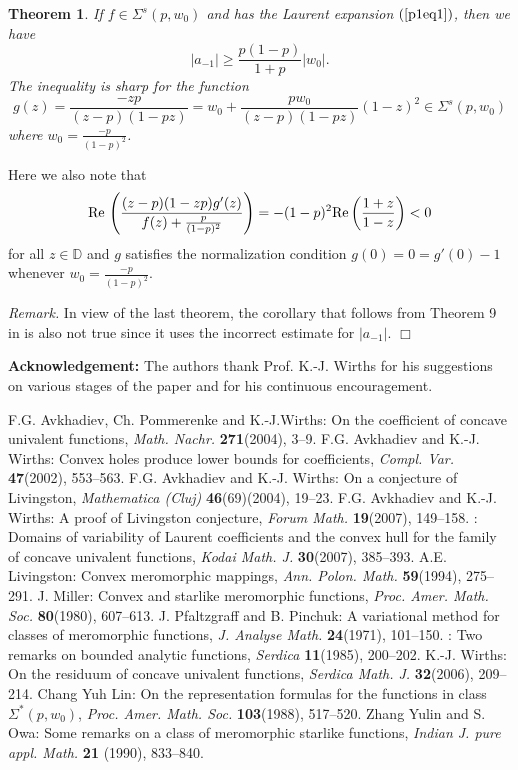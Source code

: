 \documentclass[leqno,
12pt]{amsart}
\newtheorem{thm}{Theorem}[section]
\theoremstyle{definition}
\newenvironment{rem}{\bigskip
\noindent \textsl{{\sl Remark. }}}{\bigskip}
\begin{document}
\begin{thm}\label{1th7}
If $f\in\Sigma^{s}(p, w_0)$ and has the Laurent expansion
$(\ref{p1eq1})$, then we have
$$|a_{-1}|\geq \frac{p(1-p)}{1+p}|w_0|.
$$
The inequality is sharp for the function
$$g(z)=\frac{-zp}{(z-p)(1-pz)}
= w_0+\frac{pw_0}{(z-p)(1-pz)}(1-z)^2\in \Sigma^{s}(p, w_0)
$$
where $w_0=\frac{-p}{(1-p)^2}$.
\end{thm}

Here we also note that
$${\rm Re}\, \left(\frac{(z-p)(1-zp)g'(z)}{f(z)+\frac{p}{(1-p)^2}}\right)
=-(1-p)^2 {\rm Re}\left(\frac{1+z}{1-z}\right)<0
$$
for all $z\in {{\mathbb D}}$ and $g$ satisfies the normalization condition $g(0)=0=g'(0)-1$
whenever $w_0=\frac{-p}{(1-p)^2}$.

\begin{rem}
In view of the last theorem, the corollary that follows from Theorem 9 in \cite{Living-94}
is also not true since it uses the incorrect estimate for $|a_{-1}|$.
\hfill $\Box$
\end{rem}

{\bf Acknowledgement:} The authors thank Prof. K.-J. Wirths for his
suggestions on various stages of the paper and for his
continuous encouragement.

\begin{thebibliography}{99}
 {\sc F.G. Avkhadiev, Ch. Pommerenke and K.-J.Wirths}:
On the coefficient of concave univalent functions,
\textit{Math. Nachr.} {\bf 271}(2004),  3--9.
 {\sc F.G. Avkhadiev  and K.-J. Wirths}:
Convex holes produce lower bounds for coefficients,
\textit{Compl. Var.} {\bf 47}(2002),  553--563.
 {\sc F.G. Avkhadiev and K.-J. Wirths}:
On a conjecture of Livingston,
\textit{Mathematica (Cluj)} {\bf 46}(69)(2004),  19--23.
 {\sc F.G. Avkhadiev and K.-J. Wirths}:
A proof of Livingston conjecture,
\textit{Forum Math.} {\bf 19}(2007),  149--158.
:
Domains of variability of Laurent coefficients and the convex hull for the family of concave
univalent functions, \textit{Kodai Math. J.} {\bf 30}(2007),  385--393.
 {\sc A.E. Livingston}:
Convex meromorphic mappings,
\textit{Ann. Polon. Math.} {\bf 59}(1994),  275--291.
 {\sc J. Miller}:
Convex and starlike meromorphic functions,
\textit{Proc. Amer. Math. Soc.} {\bf 80}(1980), 607--613.
 {\sc J. Pfaltzgraff  and B. Pinchuk}:
A variational method for classes of meromorphic functions,
\textit{J. Analyse Math.} {\bf 24}(1971),  101--150.
:
Two remarks on bounded analytic functions, \textit{Serdica} {\bf 11}(1985), 200--202.
 {\sc K.-J. Wirths}:
On the residuum of concave univalent functions,
\textit{Serdica Math. J.} {\bf 32}(2006), 209--214.
 {\sc Chang Yuh Lin}:
On the representation formulas for the functions in class
$\Sigma^*(p, w_0)$,
\textit{Proc. Amer. Math. Soc.} {\bf 103}(1988), 517--520.
 {\sc Zhang Yulin and S. Owa}:
Some remarks on a class of meromorphic starlike functions,
\textit{Indian J. pure appl. Math.} {\bf 21
}(1990), 833--840.

\end{thebibliography}
\end{document}
